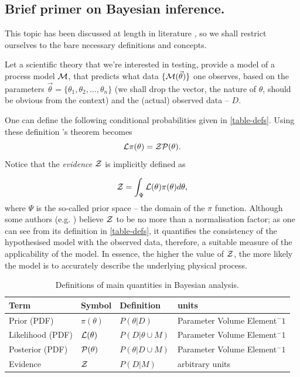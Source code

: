 \documentclass[usenatbib]{mnras}
\begin{document}
\subsection{Brief primer on Bayesian inference.}
\label{sec:org9c0c0ad}

This topic has been discussed at length in literature
\citep{jeffreys2010scientific}, so we shall restrict ourselves to the
bare necessary definitions and concepts.

Let a scientific theory that we're interested in testing, provide a
model of a process model \({\cal M}\), that predicts what data \(\lbrace {\cal M}(\vec{\theta})\rbrace\) one observes, based on the
parameters \(\vec{\theta} = \lbrace \theta_1, \theta_2, \ldots,
   \theta_n \rbrace\) (we shall drop the vector, the nature of
\(\theta\), should be obvious from the context) and the (actual)
observed data -- \(D\).

One can define the following conditional probabilities given
in \autoref{table-defs}. Using these definition \citeauthor{1763} 's theorem
becomes
\begin{equation}
 {\cal L} \pi (\theta) = {\cal Z} {\cal P} (\theta).
\label{eq:bayes} 
\end{equation}
Notice that the \emph{evidence} \({\cal Z}\) is implicitly defined as

\begin{equation}\label{eq:def-z}
 {\cal Z} = \int_{\Psi} {\cal L}(\theta) \pi(\theta) d\theta, 
\end{equation}
where \(\Psi\) is the so-called prior space -- the domain of the
\(\pi\) function. Although some authors
(e.g. \citeauthor{jeffreys2010scientific}) believe \({\cal Z}\) to be
no more than a normalisation factor; as one can see from its
definition in \autoref{table-defs}, it quantifies the consistency of
the hypothesised model with the observed data, therefore, a
suitable measure of the applicability of the model. In essence, the
higher the value of \({\cal Z}\), the more likely the model is to 
accurately describe the underlying physical process.

\begin{table}[htbp]
\caption{Definitions of main quantities in Bayesian analysis. \label{table-defs}}
\centering
\begin{tabular}{llll}
\textbf{\textbf{Term}} & \textbf{\textbf{Symbol}} & \textbf{\textbf{Definition}} & \textbf{\textbf{units}}\\
\hline
Prior (PDF) & \(\pi(\theta)\) & \(P ( \theta  \vert D)\) & Parameter Volume Element\(^-1\)\\
Likelihood (PDF) & \({\cal L}(\theta)\) & \(P ( D \vert \theta \cup M)\) & Parameter Volume Element\(^-1\)\\
Posterior (PDF) & \({\cal P}(\theta)\) & \(P ( \theta \vert D \cup M)\) & Parameter Volume Element\(^-1\)\\
Evidence & \({\cal Z}\) & \(P ( D \vert M)\) & arbitrary units\\
\end{tabular}
\end{table}
\end{document}
